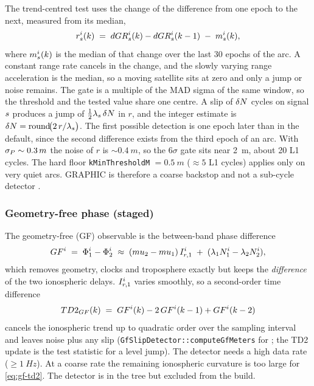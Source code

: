 \documentclass[main.tex]{subfiles}
\begin{document}
The trend-centred test uses the change of the difference from one epoch to the
next, measured from its median,
\begin{equation}
r^i_s(k)
\;=\;
dGR^i_s(k) - dGR^i_s(k-1)
\;-\; m^i_s(k),
\label{eq:graphic-resid}
\end{equation}
where $m^i_s(k)$ is the median of that change over the last 30 epochs
of the arc.  A constant range rate cancels in the change, and the slowly
varying range acceleration is the median, so a moving satellite sits at zero
and only a jump or noise remains.  The gate is a multiple of the MAD sigma of
the same window, so the threshold and the tested value share one centre.  A
slip of $\delta N$ cycles on signal $s$ produces a jump of
$\tfrac12 \lambda_s\,\delta N$ in $r$, and the integer estimate is
$\delta N = \operatorname{round}\!\bigl(2\,r / \lambda_s\bigr)$.  The first
possible detection is one epoch later than in the default, since the second
difference exists from the third epoch of an arc.
With $\sigma_\code \sim \SI{0.3}{m}$ the noise of $r$ is
$\sim\SI{0.4}{m}$, so the $6\sigma$ gate sits near \SI{2}{m}, about 20 L1
cycles.  The hard floor \texttt{kMinThresholdM} $= \SI{0.5}{m}$
($\approx 5$ L1 cycles) applies only on very quiet arcs.  GRAPHIC is therefore a
coarse backstop and not a sub-cycle detector \cite{yunck1993coping,banville2013mitigating}.

\subsubsection{Geometry-free phase (staged)}\label{sec:slip-gf}

The geometry-free (GF) observable is the between-band phase difference
\begin{equation}
GF^i \;=\; \Phi^i_{1} - \Phi^i_{2}
\;\approx\;
(mu_2 - mu_1)\,I^i_{r,1}
\;+\; (\lambda_1 N^i_1 - \lambda_2 N^i_2),
\label{eq:gf}
\end{equation}
which removes geometry, clocks and troposphere exactly but keeps the
\emph{difference} of the two ionospheric delays.  $I^i_{r,1}$ varies
smoothly, so a second-order time difference
\begin{equation}
TD2_{GF}(k)
\;=\;
GF^i(k) - 2\,GF^i(k-1) + GF^i(k-2)
\label{eq:gf-td2}
\end{equation}
cancels the ionospheric trend up to quadratic order over the sampling
interval and leaves noise plus any slip
(\texttt{GfSlipDetector::computeGfMeters} for ; the TD2
update is the test statistic for a level jump).  The detector needs a
high data rate ($\ge \SI{1}{Hz}$).  At a coarse rate the remaining
ionospheric curvature is too large for \eqref{eq:gf-td2}.  The detector
is in the tree but excluded from the build.
\end{document}
